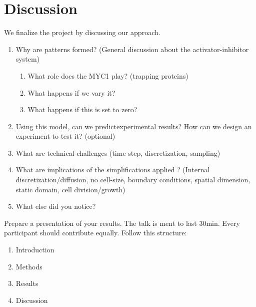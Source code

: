 \section{Discussion}
We finalize the project by discussing our approach.
\begin{enumerate}
    \item Why are patterns formed? (General discussion about the activator-inhibitor system)
    \begin{enumerate}
        \item What role does the MYC1 play? (trapping proteins)
        \item What happens if we vary it?
        \item What happens if this is set to zero?
    \end{enumerate}
    \item Using this model, can we predictexperimental results?
    How can we design an experiment to test it? (optional)
    \item What are technical challenges (time-step, discretization, sampling)
    \item What are implications of the simplifications applied ? (Internal discretization/diffusion, no cell-size, boundary conditions, spatial dimension, static domain, cell division/growth)
    \item What else did you notice?
\end{enumerate}
%
%
Prepare a presentation of your results.
The talk is ment to last 30min.
Every participant should contribute equally.
Follow this structure:
\begin{enumerate}
    \item Introduction
    \item Methods
    \item Results
    \item Discussion
\end{enumerate}